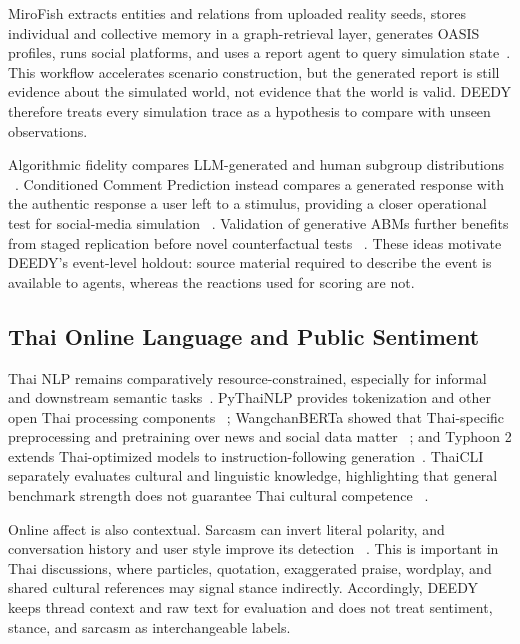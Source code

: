 \documentclass[conference]{IEEEtran}
\begin{document}
MiroFish extracts entities and relations from uploaded reality seeds, stores
individual and collective memory in a graph-retrieval layer, generates OASIS
profiles, runs social platforms, and uses a report agent to query simulation
state~\cite{mirofish2026}. This workflow accelerates scenario construction, but
the generated report is still evidence about the simulated world, not evidence
that the world is valid. DEEDY therefore treats every simulation trace as a
hypothesis to compare with unseen observations.

Algorithmic fidelity compares LLM-generated and human subgroup distributions
~\cite{argyle2023out}. Conditioned Comment Prediction instead compares a
generated response with the authentic response a user left to a stimulus,
providing a closer operational test for social-media simulation
~\cite{schwager2026conditioned}. Validation of generative ABMs further benefits
from staged replication before novel counterfactual tests
~\cite{cross2025validating}. These ideas motivate DEEDY's event-level holdout:
source material required to describe the event is available to agents, whereas
the reactions used for scoring are not.

\subsection{Thai Online Language and Public Sentiment}

Thai NLP remains comparatively resource-constrained, especially for informal
and downstream semantic tasks~\cite{arreerard2022survey}. PyThaiNLP provides
tokenization and other open Thai processing components
~\cite{phatthiyaphaibun2023pythainlp}; WangchanBERTa showed that Thai-specific
preprocessing and pretraining over news and social data matter
~\cite{lowphansirikul2021wangchanberta}; and Typhoon 2 extends Thai-optimized
models to instruction-following generation~\cite{pipatanakul2024typhoon2}.
ThaiCLI separately evaluates cultural and linguistic knowledge, highlighting
that general benchmark strength does not guarantee Thai cultural competence
~\cite{kim2025thaicli}.

Online affect is also contextual. Sarcasm can invert literal polarity, and
conversation history and user style improve its detection
~\cite{hazarika2018cascade}. This is important in Thai discussions, where
particles, quotation, exaggerated praise, wordplay, and shared cultural
references may signal stance indirectly. Accordingly, DEEDY keeps thread
context and raw text for evaluation and does not treat sentiment, stance, and
sarcasm as interchangeable labels.
\end{document}
